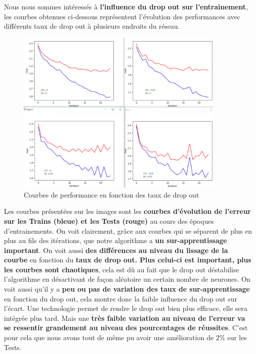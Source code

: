 \documentclass[12pt,a4paper]{extarticle}
\begin{document}
Nous nous sommes intéressés à \textbf{l'influence du drop out sur l'entrainement}, les courbes obtenues ci-dessous représentent l'évolution des performances avec différents taux de drop out à plusieurs endroits du réseau.

\begin{figure}[h]
        \centering
        \includegraphics[height=8cm]{dor_compare}
        \caption{Courbes de performance en fonction des taux de drop out}
\end{figure}


Les courbes présentées sur les images sont les \textbf{courbes d'évolution de l'erreur sur les Trains (bleue) et les Tests (rouge)} au cours des époques d'entrainements. On voit clairement, grâce aux courbes qui se séparent de plus en plus au fils des itérations, que notre algorithme a \textbf{un sur-apprentissage important}. On voit aussi \textbf{des différences au niveau du lissage de la courbe} en fonction du \textbf{taux de drop out. Plus celui-ci est important, plus les courbes sont chaotiques}, cela est dû au fait que le drop out déstabilise l'algorithme en désactivant de façon aléatoire un certain nombre de neurones. On voit aussi qu'il y a \textbf{peu ou pas de variation des taux de sur-apprentissage} en fonction du drop out, cela montre donc la faible influence du drop out sur l'écart. Une technologie permet de rendre le drop out bien plus efficace, elle sera intégrée plus tard. Mais une \textbf{très faible variation au niveau de l'erreur va se ressentir grandement au niveau des pourcentages de réussites}. C'est pour cela que nous avons tout de même pu avoir une amélioration de $2\%$ sur les Tests.  \\
\end{document}
